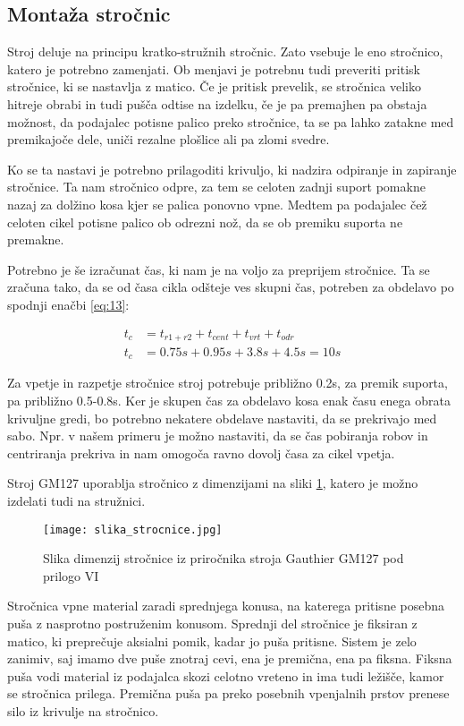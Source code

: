 \newpage

\subsection{Montaža stročnic}
Stroj deluje na principu kratko-stružnih stročnic. Zato vsebuje le eno stročnico,
katero je potrebno zamenjati. Ob menjavi je potrebnu tudi preveriti pritisk
stročnice, ki se nastavlja z matico. Če je pritisk prevelik, se stročnica veliko
hitreje obrabi in tudi pušča odtise na izdelku, če je pa premajhen pa obstaja možnost,
da podajalec potisne palico preko stročnice, ta se pa lahko zatakne med
premikajoče dele, uniči rezalne plošlice ali pa zlomi svedre.

Ko se ta nastavi je potrebno prilagoditi krivuljo, ki nadzira odpiranje in
zapiranje stročnice. Ta nam stročnico odpre, za tem se celoten zadnji suport
pomakne nazaj za dolžino kosa kjer se palica ponovno vpne. Medtem pa podajalec
čež celoten cikel potisne palico ob odrezni nož, da se ob premiku suporta ne premakne.

Potrebno je še izračunat čas, ki nam je na voljo za preprijem stročnice.
Ta se zračuna tako, da se od časa cikla odšteje ves skupni čas, potreben
za obdelavo po spodnji enačbi \ref{eq:13}:

\begin{equation}
	\label{eq:13}
	\begin{split}
		t_c &= t_{r1+r2} + t_{cent} + t_{vrt} + t_{odr} \\
		t_c &= 0.75s + 0.95s + 3.8s + 4.5s = 10s
	\end{split}
\end{equation}

Za vpetje in razpetje stročnice stroj potrebuje približno 0.2s, za premik
suporta, pa približno 0.5-0.8s. Ker je skupen čas za obdelavo kosa
enak času enega obrata krivuljne gredi, bo potrebno nekatere obdelave
nastaviti, da se prekrivajo med sabo. Npr. v našem primeru je možno
nastaviti, da se čas pobiranja robov in centriranja prekriva in
nam omogoča ravno dovolj časa za cikel vpetja.

Stroj GM127 uporablja stročnico z dimenzijami na sliki \ref{slika_strocnice},
katero je možno izdelati tudi na stružnici.

\begin{figure}[H]
	\begin{center}
		\texttt{[image: slika\_strocnice.jpg]}
		\caption{Slika dimenzij stročnice iz priročnika
			stroja Gauthier GM127 pod prilogo VI
			\cite{gauthier}}
		\label{slika_strocnice}
	\end{center}
\end{figure}

Stročnica vpne material zaradi sprednjega konusa, na katerega
pritisne posebna puša z nasprotno postruženim konusom. Sprednji
del stročnice je fiksiran z matico, ki preprečuje aksialni pomik,
kadar jo puša pritisne. Sistem je zelo zanimiv, saj imamo dve
puše znotraj cevi, ena je premična, ena pa fiksna. Fiksna puša
vodi material iz podajalca skozi celotno vreteno in ima tudi
ležišče, kamor se stročnica prilega. Premična puša pa preko
posebnih vpenjalnih prstov prenese silo iz krivulje na stročnico.